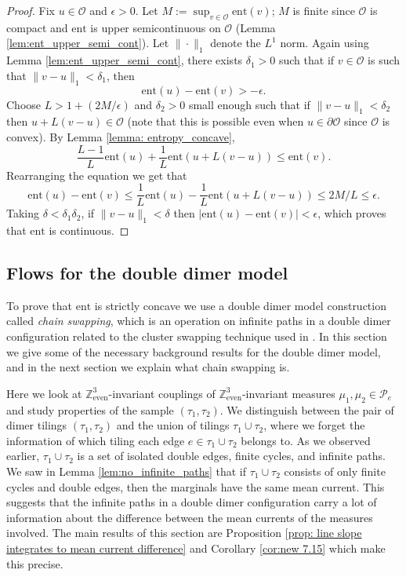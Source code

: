 \documentclass[11pt]{article}
\theoremstyle{remark}
\theoremstyle{definition}
\newcommand{\Z}{\mathbb{Z}}
\newcommand{\norm}[1] {\| #1\|}
\newcommand{\Prob}{\mathcal P}
\newcommand{\ent}{\text{ent}}
\newcommand{\threeeven}{\Z^3_{\text{even}}}
\newcommand{\mc}[1]{\mathcal{#1}}
\begin{document}
\begin{proof}
	Fix $u\in \mathcal O$ and $\epsilon>0$. Let $M:=\sup_{v \in \mathcal O} \text{ent}(v)$; $M$ is finite since $\mc O$ is compact and $\ent$ is upper semicontinuous on $\mc O$ (Lemma \ref{lem:ent_upper_semi_cont}). Let $\norm{\cdot}_1$ denote the $L^1$ norm. Again using Lemma \ref{lem:ent_upper_semi_cont}, there exists $\delta_1>0$ such that if $v\in \mathcal O$ is such that $\|v-u\|_1<\delta_1$, then
	\begin{equation*}
	\text{ent}(u)-\text{ent}(v)> -\epsilon.    
	\end{equation*}
	Choose $L>1+ (2M/\epsilon)$ and $\delta_2>0$ small enough such that if $\|v- u\|_1<\delta_2$ then 
	$u+ L(v -u)\in \mathcal O$ (note that this is possible even when $u\in \partial \mc O$ since $\mc O$ is convex).
	By Lemma \ref{lemma: entropy_concave}, 
	$$\frac{L-1}{L}\text{ent}(u)+\frac{1}{L}\text{ent}(u+ L(v -u))\leq \text{ent}(v).$$
	Rearranging the equation we get that 
	\begin{equation*}
	\text{ent}(u)-\text{ent}(v)\leq \frac{1}{L}\text{ent}(u)-\frac{1}{L}\text{ent}(u+ L(v -u))\leq 2M/L\leq \epsilon.
	\end{equation*}
	Taking $\delta<\delta_1\delta_2$, if $\|v -u\|_1<\delta$ then $|\text{ent}(u)-\text{ent}(v)|<\epsilon$, which proves that $\text{ent}$ is continuous.
\end{proof}

\subsection{Flows for the double dimer model}\label{subsection: flows for double dimer}

To prove that $\ent$ is strictly concave we use a double dimer model construction called \textit{chain swapping}, which is an operation on infinite paths in a double dimer configuration related to the cluster swapping technique used in \cite{AST_2005__304__R1_0}. In this section we give some of the necessary background results for the double dimer model, and in the next section we explain what chain swapping is.

Here we look at $\threeeven$-invariant couplings of $\threeeven$-invariant measures $\mu_1, \mu_2\in \Prob_e$ and study properties of the sample $(\tau_1, \tau_2)$. We distinguish between the pair of dimer tilings $(\tau_1,\tau_2)$ and the union of tilings $\tau_1\cup \tau_2$, where we forget the information of which tiling each edge $e\in \tau_1\cup \tau_2$ belongs to. As we observed earlier, $\tau_1\cup \tau_2$ is a set of isolated double edges, finite cycles, and infinite paths. We saw in Lemma \ref{lem:no_infinite_paths} that if $\tau_1\cup \tau_2$ consists of only finite cycles and double edges, then the marginals have the same mean current. This suggests that the infinite paths in a double dimer configuration carry a lot of information about the difference between the  mean currents of the measures involved. The main results of this section are Proposition \ref{prop: line slope integrates to mean current difference} and Corollary \ref{cor:new 7.15} which make this precise.
\end{document}

